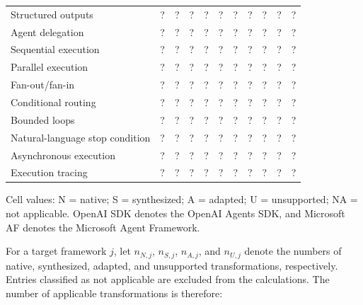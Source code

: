 \begin{table}[t]
\begin{tabularx}{\textwidth}{
        @{}
        >{\raggedright\arraybackslash}X
        cccccccccc
        @{}
    }
        Structured outputs
        & ? & ? & ? & ? & ? & ? & ? & ? & ? & ? \\

        Agent delegation
        & ? & ? & ? & ? & ? & ? & ? & ? & ? & ? \\

        Sequential execution
        & ? & ? & ? & ? & ? & ? & ? & ? & ? & ? \\

        Parallel execution
        & ? & ? & ? & ? & ? & ? & ? & ? & ? & ? \\

        Fan-out/fan-in
        & ? & ? & ? & ? & ? & ? & ? & ? & ? & ? \\

        Conditional routing
        & ? & ? & ? & ? & ? & ? & ? & ? & ? & ? \\

        Bounded loops
        & ? & ? & ? & ? & ? & ? & ? & ? & ? & ? \\

        Natural-language stop condition
        & ? & ? & ? & ? & ? & ? & ? & ? & ? & ? \\

        Asynchronous execution
        & ? & ? & ? & ? & ? & ? & ? & ? & ? & ? \\

        Execution tracing
        & ? & ? & ? & ? & ? & ? & ? & ? & ? & ? \\

        \bottomrule
    \end{tabularx}

    \vspace{0.3em}
        \begin{minipage}{0.98\textwidth}
            \scriptsize
            Cell values: N = native; S = synthesized; A = adapted;
            U = unsupported; NA = not applicable. OpenAI SDK denotes
            the OpenAI Agents SDK, and Microsoft AF denotes the
            Microsoft Agent Framework.
        \end{minipage}
\end{table}

For a target framework \(j\), let \(n_{N,j}\), \(n_{S,j}\),
\(n_{A,j}\), and \(n_{U,j}\) denote the numbers of native, synthesized,
adapted, and unsupported transformations, respectively. Entries classified
as not applicable are excluded from the calculations. The number of
applicable transformations is therefore:


